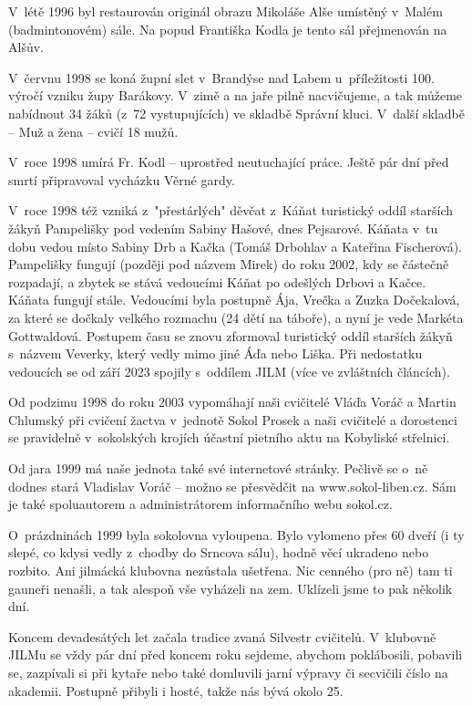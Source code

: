\documentclass[a5paper, 11pt, twoside]{article}
\begin{document}
V~létě 1996 byl restaurován originál obrazu Mikoláše Alše umístěný
v~Malém (badmintonovém) sále. Na popud Františka Kodla je tento sál
přejmenován na Alšův.

V~červnu 1998 se koná župní slet v~Brandýse nad Labem u~příležitosti
100. výročí vzniku župy Barákovy. V~zimě a na jaře pilně nacvičujeme, a
tak můžeme nabídnout 34 žáků (z~72 vystupujících) ve skladbě Správní
kluci. V~další skladbě -- Muž a žena -- cvičí 18 mužů.

V~roce 1998 umírá Fr. Kodl -- uprostřed neutuchající práce. Ještě pár
dní před smrtí připravoval vycházku Věrné gardy.

V~roce 1998 též vzniká z~"přestárlých" děvčat z~Káňat turistický oddíl
starších žákyň Pampelišky pod vedením Sabiny Hašové, dnes Pejsarové.
Káňata v~tu dobu vedou místo Sabiny Drb a Kačka (Tomáš Drbohlav a
Kateřina Fischerová). Pampelišky fungují (později pod názvem Mirek) do
roku 2002, kdy se částečně rozpadají, a zbytek se stává vedoucími Káňat
po odešlých Drbovi a Kačce. Káňata fungují stále. Vedoucími byla
postupně Ája, Vrečka a Zuzka Dočekalová, za které se dočkaly velkého
rozmachu (24 dětí na táboře), a nyní je vede Markéta Gottwaldová.
Postupem času se znovu zformoval turistický oddíl starších žákyň
s~názvem Veverky, který vedly mimo jiné Áďa nebo Liška. Při nedostatku
vedoucích se od září 2023 spojily s~oddílem JILM (více ve zvláštních
článcích).

Od podzimu 1998 do roku 2003 vypomáhají naši cvičitelé Vláďa Voráč a
Martin Chlumský při cvičení žactva v~jednotě Sokol Prosek a naši
cvičitelé a dorostenci se pravidelně v~sokolských krojích účastní
pietního aktu na Kobyliské střelnici.

Od jara 1999 má naše jednota také své internetové stránky. Pečlivě se
o~ně dodnes stará Vladislav Voráč -- možno se přesvědčit na www.sokol-liben.cz. Sám je také
spoluautorem a administrátorem informačního webu sokol.cz.

O~prázdninách 1999 byla sokolovna vyloupena. Bylo vylomeno přes 60 dveří
(i ty slepé, co kdysi vedly z~chodby do Srncova sálu), hodně věcí
ukradeno nebo rozbito. Ani jilmácká klubovna nezůstala ušetřena. Nic
cenného (pro ně) tam ti gauneři nenašli, a tak alespoň vše vyházeli na
zem. Uklízeli jsme to pak několik dní.

Koncem devadesátých let začala tradice zvaná Silvestr cvičitelů.
V~klubovně JILMu se vždy pár dní před koncem roku sejdeme, abychom
poklábosili, pobavili se, zazpívali si při kytaře nebo také domluvili
jarní výpravy či secvičili číslo na akademii. Postupně přibyli i hosté,
takže nás bývá okolo 25.
\end{document}
